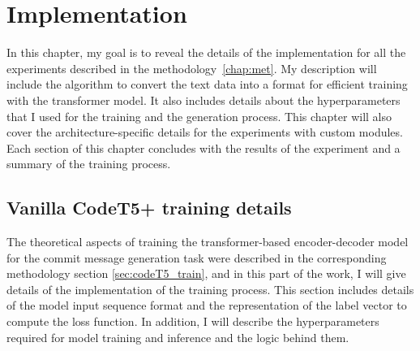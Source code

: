 \chapter{Implementation}\label{chap:impl}
In this chapter, my goal is to reveal the details of the implementation for all the experiments described in the methodology~\ref{chap:met}. My description will include the algorithm to convert the text data into a format for efficient training with the transformer model. It also includes details about the hyperparameters that I used for the training and the generation process. This chapter will also cover the architecture-specific details for the experiments with custom modules. Each section of this chapter concludes with the results of the experiment and a summary of the training process.
\section{Vanilla CodeT5+ training details}
The theoretical aspects of training the transformer-based encoder-decoder model for the commit message generation task were described in the corresponding methodology section \ref{sec:codeT5_train}, and in this part of the work, I will give details of the implementation of the training process. This section includes details of the model input sequence format and the representation of the label vector to compute the loss function. In addition, I will describe the hyperparameters required for model training and inference and the logic behind them.

